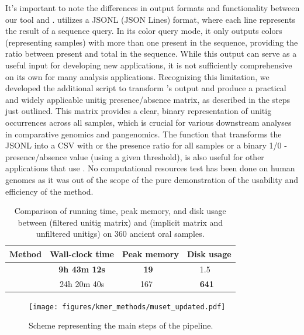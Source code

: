 It's important to note the differences in output formats and functionality between our tool and \ggcat. \ggcat utilizes a JSONL (JSON Lines) format, where each line represents the result of a sequence query. In its color query mode, it only outputs colors (representing samples) with more than one \kmer present in the sequence, providing the ratio between present \kmers and total \kmers in the sequence. While this output can serve as a useful input for developing new applications, it is not sufficiently comprehensive on its own for many analysis applications. Recognizing this limitation, we developed the additional \muset script to transform \ggcat's output and produce a practical and widely applicable unitig presence/absence matrix, as described in the steps just outlined. This matrix provides a clear, binary representation of unitig occurrences across all samples, which is crucial for various downstream analyses in comparative genomics and pangenomics. The \kmat function that transforms the JSONL into a CSV with or the presence ratio for all samples or a binary 1/0 - presence/absence value (using a given threshold), is also useful for other applications that use \ggcat.
No computational resources test has been done on human genomes as it was out of the scope of the pure demonstration of the usability and efficiency of the method.
\begin{table}[!t]
	\centering
	\begin{tabular}{lccc}
		\toprule
		Method & Wall-clock time & Peak memory & Disk usage \\
		\midrule
		\muset & \textbf{9h 43m 12s} & \textbf{\SI[detect-weight=true]{19}{\textbf{\giga\byte}}} & \SI[detect-weight=true]{1.5}{\tera\byte}\\
		\ggcat & 24h 20m 40s & \SI{167}{\giga\byte} & \textbf{\SI{641}{\textbf{\giga\byte}}} \\
		\bottomrule
	\end{tabular}
	\caption{Comparison of running time, peak memory, and disk usage between \muset (filtered unitig matrix) and \ggcat (implicit matrix and unfiltered unitigs) on 360 ancient oral samples.}\label{tab:muset_comparison}
\end{table}

\begin{figure}[h!]
	\centering
	\texttt{[image: figures/kmer\_methods/muset\_updated.pdf]}
	\caption[The \muset pipeline]{Scheme representing the main steps of the \muset pipeline.}
	\label{fig:muset}
\end{figure}

